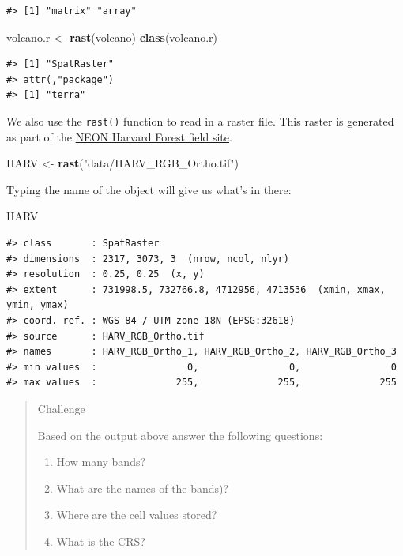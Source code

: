 \documentclass[
]{book}
\newenvironment{Shaded}{\begin{snugshade}}{\end{snugshade}}
\newcommand{\FunctionTok}[1]{\textcolor[rgb]{0.13,0.29,0.53}{\textbf{#1}}}
\newcommand{\NormalTok}[1]{#1}
\newcommand{\OtherTok}[1]{\textcolor[rgb]{0.56,0.35,0.01}{#1}}
\newcommand{\StringTok}[1]{\textcolor[rgb]{0.31,0.60,0.02}{#1}}
\providecommand{\tightlist}{%
  \setlength{\itemsep}{0pt}\setlength{\parskip}{0pt}}
\begin{document}
\begin{verbatim}
#> [1] "matrix" "array"
\end{verbatim}

\begin{Shaded}
\begin{Highlighting}[]
\NormalTok{volcano.r }\OtherTok{\textless{}{-}} \FunctionTok{rast}\NormalTok{(volcano)}
\FunctionTok{class}\NormalTok{(volcano.r)}
\end{Highlighting}
\end{Shaded}

\begin{verbatim}
#> [1] "SpatRaster"
#> attr(,"package")
#> [1] "terra"
\end{verbatim}

We also use the \texttt{rast()} function to read in a raster file. This raster is generated as part of the \href{https://www.neonscience.org/field-sites/field-sites-map/HARV}{NEON Harvard Forest field site}.

\begin{Shaded}
\begin{Highlighting}[]
\NormalTok{HARV }\OtherTok{\textless{}{-}} \FunctionTok{rast}\NormalTok{(}\StringTok{"data/HARV\_RGB\_Ortho.tif"}\NormalTok{)}
\end{Highlighting}
\end{Shaded}

Typing the name of the object will give us what's in there:

\begin{Shaded}
\begin{Highlighting}[]
\NormalTok{HARV}
\end{Highlighting}
\end{Shaded}

\begin{verbatim}
#> class       : SpatRaster 
#> dimensions  : 2317, 3073, 3  (nrow, ncol, nlyr)
#> resolution  : 0.25, 0.25  (x, y)
#> extent      : 731998.5, 732766.8, 4712956, 4713536  (xmin, xmax, ymin, ymax)
#> coord. ref. : WGS 84 / UTM zone 18N (EPSG:32618) 
#> source      : HARV_RGB_Ortho.tif 
#> names       : HARV_RGB_Ortho_1, HARV_RGB_Ortho_2, HARV_RGB_Ortho_3 
#> min values  :                0,                0,                0 
#> max values  :              255,              255,              255
\end{verbatim}

\begin{quote}
Challenge

Based on the output above answer the following questions:

\begin{enumerate}
\def\labelenumi{\arabic{enumi}.}
\tightlist
\item
  How many bands?
\item
  What are the names of the bands)?
\item
  Where are the cell values stored?
\item
  What is the CRS?
\end{enumerate}
\end{quote}
\end{document}
